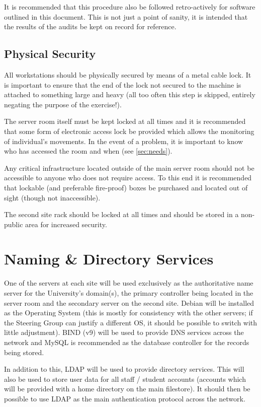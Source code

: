 \documentclass[a4paper, twoside]{article}
\begin{document}
It is recommended that this procedure also be followed retro-actively for
software outlined in this document. This is not just a point of sanity, it is
intended that the results of the audits be kept on record for reference.

\subsection{Physical Security}
All workstations should be physically secured by means of a metal cable lock. It
is important to ensure that the end of the lock not secured to the machine is
attached to something large and heavy (all too often this step is skipped,
entirely negating the purpose of the exercise!).

The server room itself must be kept locked at all times and it is recommended
that some form of electronic access lock be provided which allows the monitoring
of individual's movements. In the event of a problem, it is important to know
who has accessed the room and when (see \ref{sec:needs}).

Any critical infrastructure located outside of the main server room should not
be accessible to anyone who does not require access. To this end it is
recommended that lockable (and preferable fire-proof) boxes be purchased and
located out of sight (though not inaccessible).

The second site rack should be locked at all times and should be stored in a
non-public area for increased security.

\clearpage
\section{Naming \& Directory Services}
\label{sec:nandd}
One of the servers at each site will be used exclusively as the authoritative name server for
the University's domain(s), the primary controller being located in the server
room and the secondary server on the second site. Debian will be installed as the Operating System
(this is mostly for consistency with the other servers; if the Steering Group
can justify a different OS, it should be possible to switch with little
adjustment). BIND (v9) will be used to provide DNS services across the network
and MySQL is recommended as the database controller for the records being
stored.

In addition to this, LDAP will be used to provide directory services. This will
also be used to store user data for all staff / student accounts (accounts which
will be provided with a home directory on the main filestore). It should then be
possible to use LDAP as the main authentication protocol across the network.
\end{document}

